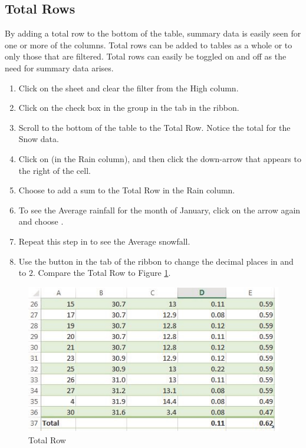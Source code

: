 \subsection{Total Rows}

By adding a total row to the bottom of the table, summary data is easily seen for one or more of the columns. Total rows can be added to tables as a whole or to only those that are filtered. Total rows can easily be toggled on and off as the need for summary data arises.

\begin{enumerate}
	\item Click on the  sheet and clear the filter from the High column.
	\item Click on the  check box in the  group in the  tab in the ribbon.
	\item Scroll to the bottom of the table to the Total Row. Notice the total for the Snow data.
	\item Click on  (in the Rain column), and then click the down-arrow that appears to the right of the cell.
	\item Choose  to add a sum to the Total Row in the Rain column.
	\item To see the Average rainfall for the month of January, click on the arrow again and choose .
	\item Repeat this step in  to see the Average snowfall.
	\item Use the  button in the  tab of the ribbon to change the decimal places in  and  to $ 2 $. Compare the Total Row to Figure \ref{05:fig22}.
\end{enumerate}

\begin{figure}[H]
	\centering
	\includegraphics[width=\maxwidth{.95\linewidth}]{gfx/ch05_fig22}
	\caption{Total Row}
	\label{05:fig22}
\end{figure}

